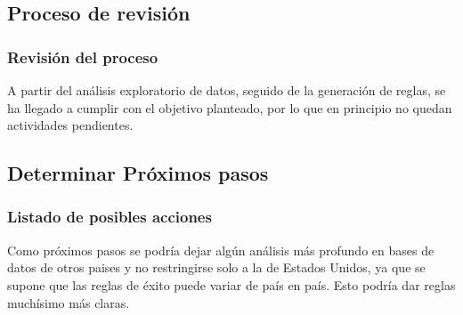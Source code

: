 \subsection{Proceso de revisión}
    \subsubsection{Revisión del proceso}

        A partir del análisis exploratorio de datos, seguido de la generación
        de reglas, se ha llegado a cumplir con el objetivo planteado, por lo
        que en principio no quedan actividades pendientes.

\subsection{Determinar Próximos pasos}
    \subsubsection{Listado de posibles acciones}

        Como próximos pasos se podría dejar algún análisis más profundo en
        bases de datos de otros paises y no restringirse solo a la de Estados
        Unidos, ya que se supone que las reglas de éxito puede variar de país
        en país. Esto podría dar reglas muchísimo más claras.